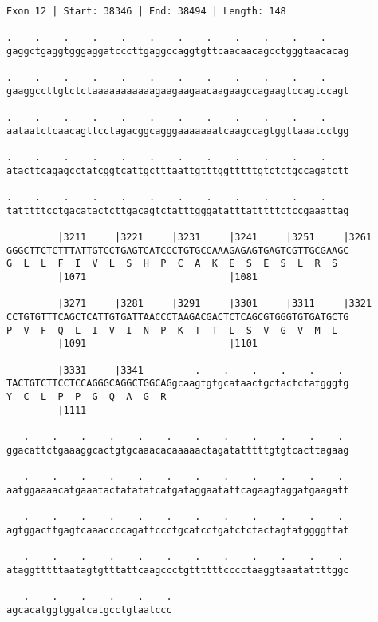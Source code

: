 \documentclass{article}
\begin{document}
\begin{Verbatim}[fontfamily=courier]
Exon 12 | Start: 38346 | End: 38494 | Length: 148

.    .    .    .    .    .    .    .    .    .    .    .    
gaggctgaggtgggaggatcccttgaggccaggtgttcaacaacagcctgggtaacacag

.    .    .    .    .    .    .    .    .    .    .    .    
gaaggccttgtctctaaaaaaaaaaagaagaagaacaagaagccagaagtccagtccagt

.    .    .    .    .    .    .    .    .    .    .    .    
aataatctcaacagttcctagacggcagggaaaaaaatcaagccagtggttaaatcctgg

.    .    .    .    .    .    .    .    .    .    .    .    
atacttcagagcctatcggtcattgctttaattgtttggtttttgtctctgccagatctt

.    .    .    .    .    .    .    .    .    .    .    .    
tatttttcctgacatactcttgacagtctatttgggatatttatttttctccgaaattag

         |3211     |3221     |3231     |3241     |3251     |3261
GGGCTTCTCTTTATTGTCCTGAGTCATCCCTGTGCCAAAGAGAGTGAGTCGTTGCGAAGC
G  L  L  F  I  V  L  S  H  P  C  A  K  E  S  E  S  L  R  S  
         |1071                         |1081                

         |3271     |3281     |3291     |3301     |3311     |3321
CCTGTGTTTCAGCTCATTGTGATTAACCCTAAGACGACTCTCAGCGTGGGTGTGATGCTG
P  V  F  Q  L  I  V  I  N  P  K  T  T  L  S  V  G  V  M  L  
         |1091                         |1101                

         |3331     |3341         .    .    .    .    .    . 
TACTGTCTTCCTCCAGGGCAGGCTGGCAGgcaagtgtgcataactgctactctatgggtg
Y  C  L  P  P  G  Q  A  G  R                                
         |1111                                              

   .    .    .    .    .    .    .    .    .    .    .    . 
ggacattctgaaaggcactgtgcaaacacaaaaactagatatttttgtgtcacttagaag

   .    .    .    .    .    .    .    .    .    .    .    . 
aatggaaaacatgaaatactatatatcatgataggaatattcagaagtaggatgaagatt

   .    .    .    .    .    .    .    .    .    .    .    . 
agtggacttgagtcaaaccccagattccctgcatcctgatctctactagtatggggttat

   .    .    .    .    .    .    .    .    .    .    .    . 
ataggtttttaatagtgtttattcaagccctgttttttcccctaaggtaaatattttggc

   .    .    .    .    .    .
agcacatggtggatcatgcctgtaatccc
\end{Verbatim}
\end{document}
